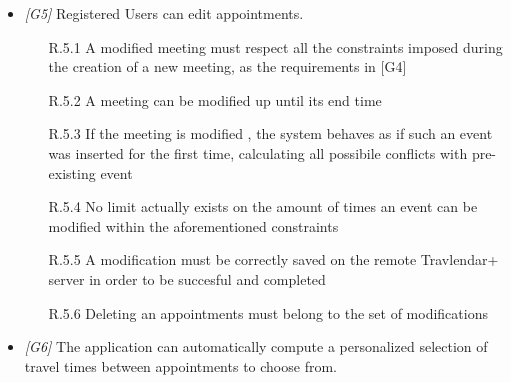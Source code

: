 \begin{itemize}
\begin{itemize}
                  \end{itemize}
                  
\item \textit{[G5]} Registered Users can edit appointments.

                  \begin{itemize}
                       \item  [R.5.1] A modified meeting must respect all the constraints imposed during the creation of a new meeting, as the requirements in [G4]
                       \item [R.5.2] A meeting can be modified up until its end time
                       \item [R.5.3] If the meeting is modified , the system behaves as if such an event was inserted for the first time, calculating all possibile conflicts with pre-existing event
                       \item [R.5.4] No limit actually exists on the amount of times an event can be modified within the aforementioned constraints 
                       \item [R.5.5] A modification must be correctly saved on the remote Travlendar+ server in order to be succesful and completed              
                       \item [R.5.6] Deleting an appointments must belong to the set of modifications

                 \end{itemize}

\item \textit{[G6]} The application can automatically compute a personalized selection of travel times between appointments to choose from.


\end{itemize}
